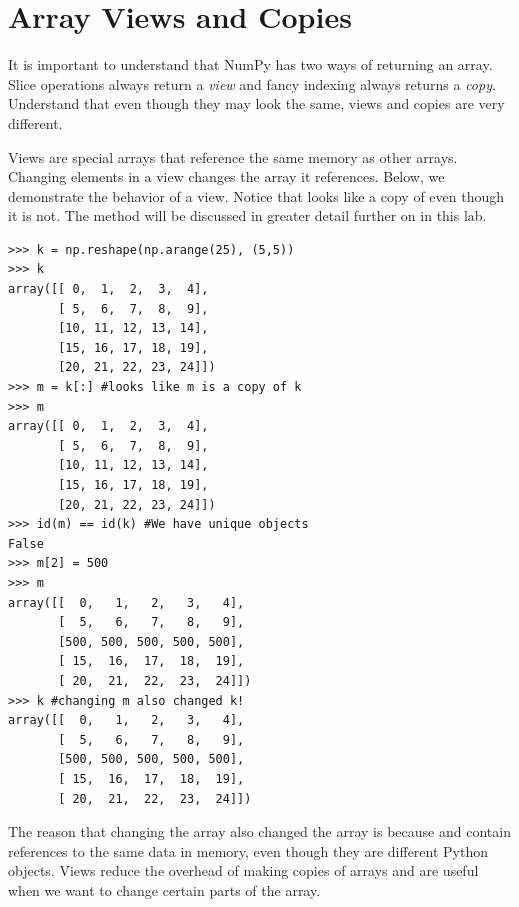 \section*{Array Views and Copies} It is important to understand that
NumPy has two ways of returning an array. Slice operations always return
a \emph{view} and fancy indexing always returns a \emph{copy}.
Understand that even though they may look the same, views and copies are
very different.

Views are special arrays that reference the same memory as other arrays.
Changing elements in a view changes the array it references. Below, we
demonstrate the behavior of a view. Notice that  looks like a copy
of  even though it is not. 
The  method will be discussed in greater detail 
further on in this lab.
\begin{lstlisting}
>>> k = np.reshape(np.arange(25), (5,5)) 
>>> k
array([[ 0,  1,  2,  3,  4],
       [ 5,  6,  7,  8,  9],
       [10, 11, 12, 13, 14],
       [15, 16, 17, 18, 19],
       [20, 21, 22, 23, 24]])
>>> m = k[:] #looks like m is a copy of k 
>>> m
array([[ 0,  1,  2,  3,  4],
       [ 5,  6,  7,  8,  9],
       [10, 11, 12, 13, 14],
       [15, 16, 17, 18, 19],
       [20, 21, 22, 23, 24]])
>>> id(m) == id(k) #We have unique objects
False
>>> m[2] = 500 
>>> m
array([[  0,   1,   2,   3,   4],
       [  5,   6,   7,   8,   9],
       [500, 500, 500, 500, 500],
       [ 15,  16,  17,  18,  19],
       [ 20,  21,  22,  23,  24]])
>>> k #changing m also changed k!
array([[  0,   1,   2,   3,   4],
       [  5,   6,   7,   8,   9],
       [500, 500, 500, 500, 500],
       [ 15,  16,  17,  18,  19],
       [ 20,  21,  22,  23,  24]])
\end{lstlisting} 

The reason that changing the array  also changed
the array  is because  and  contain references to the
same data in memory, even though they are different Python objects.
Views reduce the overhead of making copies of arrays and are useful when
we want to change certain parts of the array.

